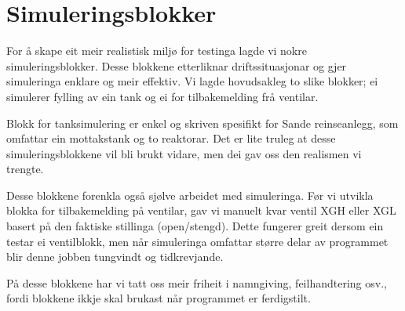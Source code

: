 \section{Simuleringsblokker}
\thispagestyle{fancy}

For å skape eit meir realistisk miljø for testinga lagde vi nokre simuleringsblokker.
Desse blokkene etterliknar driftssituasjonar og gjer simuleringa enklare og meir effektiv.
Vi lagde hovudsakleg to slike blokker; ei simulerer fylling av ein tank
og ei for tilbakemelding frå ventilar.

Blokk for tanksimulering er enkel og skriven spesifikt for Sande reinseanlegg, som omfattar ein mottakstank
og to reaktorar.
Det er lite truleg at desse simuleringsblokkene vil bli brukt vidare, men dei gav
oss den realismen vi trengte.

Desse blokkene forenkla også sjølve arbeidet med simuleringa.
Før vi utvikla blokka for tilbakemelding på ventilar, 
gav vi manuelt kvar ventil \gls{XGH} eller \gls{XGL} basert på den faktiske stillinga (open/stengd).
Dette fungerer greit dersom ein testar ei ventilblokk, men
når simuleringa omfattar større delar av programmet blir denne jobben tungvindt og tidkrevjande.

På desse blokkene har vi tatt oss meir friheit i namngiving, feilhandtering osv.,
fordi blokkene ikkje skal brukast når programmet er ferdigstilt.



